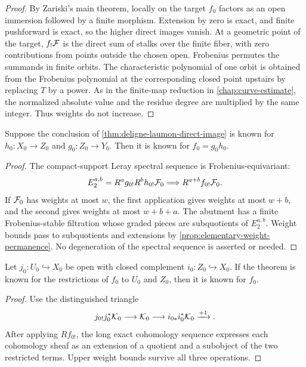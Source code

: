\begin{proof}
By Zariski's main theorem, locally on the target \(f_0\) factors as an
open immersion followed by a finite morphism.  Extension by zero is
exact, and finite pushforward is exact, so the higher direct images
vanish.  At a geometric point of the target, \(f_!\mathcal F\) is the direct
sum of stalks over the finite fiber, with zero contributions from points
outside the chosen open.  Frobenius permutes the summands in finite
orbits.  The characteristic polynomial of one orbit is obtained from
the Frobenius polynomial at the corresponding closed point upstairs by
replacing \(T\) by a power.  As in the finite-map reduction in
\cref{chap:curve-estimate}, the normalized absolute value and the residue
degree are multiplied by the same integer.  Thus weights do not
increase.
\end{proof}

\begin{lemma}[Composition]
\label{lem:weights-composition}
Suppose the conclusion of
\cref{thm:deligne-laumon-direct-image} is known for
\(h_0:X_0\to Z_0\) and \(g_0:Z_0\to Y_0\).  Then it is known for
\(f_0=g_0h_0\).
\end{lemma}

\begin{proof}
The compact-support Leray spectral sequence is Frobenius-equivariant:
\[
  E_2^{a,b}
  =
  R^ag_{0!}R^bh_{0!}\mathcal F_0
  \Longrightarrow
  R^{a+b}f_{0!}\mathcal F_0.
\]
If \(\mathcal F_0\) has weights at most \(w\), the first application gives
weights at most \(w+b\), and the second gives weights at most
\(w+b+a\).  The abutment has a finite Frobenius-stable filtration whose
graded pieces are subquotients of \(E_2^{a,b}\).  Weight bounds pass to
subquotients and extensions by
\cref{prop:elementary-weight-permanence}.  No degeneration of the
spectral sequence is asserted or needed.
\end{proof}

\begin{lemma}
\label{lem:weights-open-closed}
Let \(j_0:U_0\hookrightarrow X_0\) be open with closed complement
\(i_0:Z_0\hookrightarrow X_0\).  If the theorem is known for the
restrictions of \(f_0\) to \(U_0\) and \(Z_0\), then it is known for
\(f_0\).
\end{lemma}

\begin{proof}
Use the distinguished triangle
\[
  j_{0!}j_0^*\mathcal K_0
  \longrightarrow\mathcal K_0
  \longrightarrow i_{0*}i_0^*\mathcal K_0
  \xrightarrow{+1}.
\]
After applying \(Rf_{0!}\), the long exact cohomology sequence expresses
each cohomology sheaf as an extension of a quotient and a subobject of
the two restricted terms.  Upper weight bounds survive all three
operations.
\end{proof}


